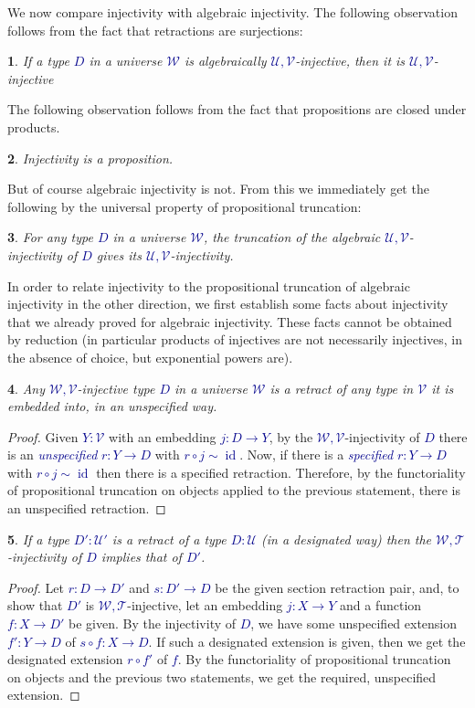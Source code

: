 \documentclass[10pt]{article}
\newcommand{\db}{\textcolor{darkblue}}
\newcommand{\df}[1]{\emph{\db{#1}}}
\newcommand{\m}[1]{\db{$#1$}}
\newcommand{\id}{\operatorname{id}}
\newcommand{\comp}{\mathrel{\circ}}
\newcommand{\U}{\mathcal{U}}
\newcommand{\V}{\mathcal{V}}
\newcommand{\W}{\mathcal{W}}
\newcommand{\T}{\mathcal{T}}
\newtheorem{numbered}{}
\theoremstyle{definition}
\begin{document}
We now compare injectivity with algebraic injectivity. The following observation follows from the fact that retractions are surjections:
\begin{numbered}
  If a type \m{D} in a universe \m{\W} is algebraically
  \m{\U,\V}-injective, then it is \m{\U,\V}-injective
\end{numbered}
\noindent The following observation follows from the fact that propositions are
closed under products.
\begin{numbered}
  Injectivity is a proposition.
\end{numbered}
But of course algebraic injectivity is not. From this we immediately
get the following by the universal property of propositional
truncation:

\begin{numbered}
  For any type \m{D} in a universe \m{\W}, the truncation of the
  algebraic \m{\U,\V}-injectivity of \m{D} gives its
  \m{\U,\V}-injectivity.
\end{numbered}

In order to relate injectivity to the propositional truncation of
algebraic injectivity in the other direction, we first establish some
facts about injectivity that we already proved for algebraic
injectivity. These facts cannot be obtained by reduction (in
particular products of injectives are not necessarily injectives, in
the absence of choice, but exponential powers are).

\begin{numbered}
  Any \m{\W,\V}-injective type \m{D} in a universe \m{\W} is a retract
  of any type in \m{\V} it is embedded into, in an unspecified way.
\end{numbered}
\begin{proof}
  Given \m{Y:\V} with an embedding \m{j : D \to Y}, by the
  \m{\W,\V}-injectivity of \m{D} there is an \df{unspecified} \m{r : Y
    \to D} with \m{r \comp j \sim \id}. Now, if there is a
  \df{specified} \m{r : Y \to D} with \m{r \comp j \sim \id} then
  there is a specified retraction. Therefore, by the functoriality of
  propositional truncation on objects applied to the previous
  statement, there is an unspecified retraction.
\end{proof}

\begin{numbered}
  If a type \m{D' : \U'} is a retract of a type \m{D : \U} (in a designated way)
  then the \m{\W,\T}-injectivity of \m{D} implies that of \m{D'}.
\end{numbered}
\begin{proof}
  Let \m{r : D \to D'} and \m{s : D' \to D} be the given section
  retraction pair, and, to show that \m{D'} is \m{\W,\T}-injective,
  let an embedding \m{j : X \to Y} and a function \m{f : X \to D'} be
  given. By the injectivity of \m{D}, we have some unspecified
  extension \m{f' : Y \to D} of \m{s \comp f : X \to D}.  If such a
  designated extension is given, then we get the designated extension
  \m{r \comp f'} of \m{f}. By the functoriality of propositional
  truncation on objects and the previous two statements, we get the
  required, unspecified extension.
\end{proof}
\end{document}
